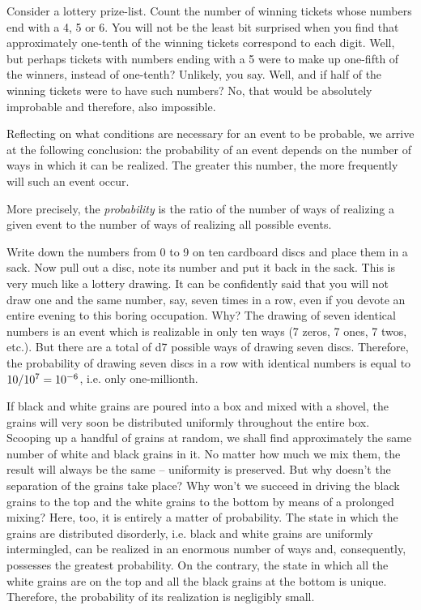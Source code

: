Consider a lottery prize-list. Count the number of win­ning tickets whose numbers end with a 4, 5 or 6. You will not be the least bit surprised when you find that approxi­mately one-tenth of the winning tickets correspond to each digit. Well, but perhaps tickets with numbers ending with a 5 were to make up one-fifth of the winners, instead of one-tenth? Unlikely, you say. Well, and if half of the winning tickets were to have such numbers? No, that would be absolutely improbable and therefore, also impossible.

Reflecting on what conditions are necessary for an event to be probable, we arrive at the following conclusion: the probability of an event depends on the number of ways in which it can be realized. The greater this num­ber, the more frequently will such an event occur.

More precisely, the \emph{probability} is the ratio of the num­ber of ways of realizing a given event to the number of ways of realizing all possible events.

Write down the numbers from 0 to 9 on ten cardboard discs and place them in a sack. Now pull out a disc, note its number and put it back in the sack. This is very much like a lottery drawing. It can be confidently said that you will not draw one and the same number, say, seven times in a row, even if you devote an entire evening to this boring occupation. Why? The drawing of seven identical numbers is an event which is realizable in only ten ways (7 zeros, 7 ones, 7 twos, etc.). But there are a total of \num{d7} possible ways of drawing seven discs. Therefore, the probability of drawing seven discs in a row with identical numbers is equal to $10/\num{d7} = \num{d-6}$, i.e. only one-millionth.

If black and white grains are poured into a box and mixed with a shovel, the grains will very soon be distri­buted uniformly throughout the entire box. Scooping up a handful of grains at random, we shall find approxi­mately the same number of white and black grains in it. No matter how much we mix them, the result will always be the same -- uniformity is preserved. But why doesn’t the separation of the grains take place? Why won’t we succeed in driving the black grains to the top and the white grains to the bottom by means of a prolonged mix­ing? Here, too, it is entirely a matter of probability. The state in which the grains are distributed disorderly, i.e. black and white grains are uniformly intermingled, can be realized in an enormous number of ways and, consequently, possesses the greatest probability. On the contrary, the state in which all the white grains are on the top and all the black grains at the bottom is unique. Therefore, the probability of its realization is negligibly small.

